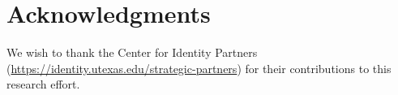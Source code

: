 \documentclass[conference]{IEEEtran}
\begin{document}
\section*{Acknowledgments}

We wish to thank the Center for Identity Partners (\url{https://identity.utexas.edu/strategic-partners}) for their contributions to this research effort.

%



% 
\appendix
\end{document}
